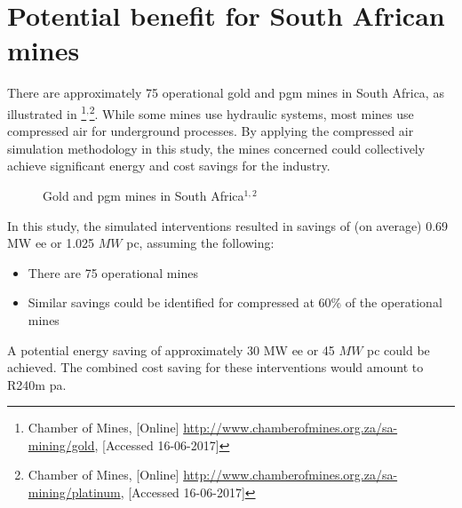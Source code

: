 \section{Potential benefit for South African mines}
There are approximately 75 operational gold and \gls{pgm} mines in South Africa, as illustrated in \footnote{Chamber of Mines, [Online] \url{http://www.chamberofmines.org.za/sa-mining/gold}, [Accessed 16-06-2017]}$^,$\footnote{Chamber of Mines, [Online] \url{http://www.chamberofmines.org.za/sa-mining/platinum}, [Accessed 16-06-2017]}. While some mines use hydraulic systems, most mines use compressed air for underground processes. By applying the compressed air simulation methodology in this study, the mines concerned could collectively achieve significant energy and cost savings for the industry. 
\par 
	\begin{figure}[h!]
		\centering
		\caption[Gold and Platinum group metal mines in South Africa]{Gold and \gls{pgm} mines in South Africa$^{1,2}$}
		\label{fig: Mine map}
	\end{figure}
In this study, the simulated interventions resulted in savings of (on average) 0.69 MW \gls{ee} or 1.025 $ MW $ \gls{pc}, assuming the following:
\begin{itemize}
	\item There are 75 operational mines
	\item Similar savings could be identified for compressed at 60\% of the operational mines
\end{itemize} 
A potential energy saving of approximately 30 MW \gls{ee} or 45 $ MW $ \gls{pc} could be achieved. The combined cost saving for these interventions would amount to R240m \gls{pa}. 

